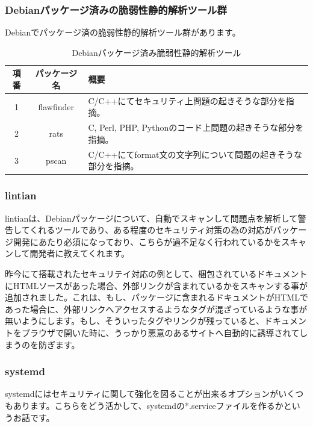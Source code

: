 \documentclass[mingoth,a4paper]{jsarticle}
\begin{document}
 \subsubsection{Debianパッケージ済みの脆弱性静的解析ツール群}

  Debianでパッケージ済の脆弱性静的解析ツール群があります。

\begin{table}
\begin{center}
\begin{tabular}{|c|c|p{5cm}|}
\hline
項番 & パッケージ名 & 概要 \\ \hline \hline
1 & flawfinder & C/C++にてセキュリティ上問題の起きそうな部分を指摘。 \\ \hline
2 & rats & C, Perl, PHP, Pythonのコード上問題の起きそうな部分を指摘。\\ \hline
3 & pscan & C/C++にてformat文の文字列について問題の起きそうな部分を指摘。 \\ \hline
\end{tabular}
\end{center}
\caption{Debianパッケージ済み脆弱性静的解析ツール}
\end{table}

\subsubsection{lintian}

 lintianは、Debianパッケージについて、自動でスキャンして問題点を解析して警告してくれるツールであり、ある程度のセキュリティ対策の為の対応がパッケージ開発にあたり必須になっており、こちらが過不足なく行われているかをスキャンして開発者に教えてくれます。

 昨今にて搭載されたセキュリテイ対応の例として、梱包されているドキュメントにHTMLソースがあった場合、外部リンクが含まれているかをスキャンする事が追加されました。これは、もし、パッケージに含まれるドキュメントがHTMLであった場合に、外部リンクへアクセスするようなタグが混ざっているような事が無いようにします。もし、そういったタグやリンクが残っていると、ドキュメントをブラウザで開いた時に、うっかり悪意のあるサイトへ自動的に誘導されてしまうのを防ぎます。

\subsubsection{systemd}

 systemdにはセキュリティに関して強化を図ることが出来るオプションがいくつもあります。こちらをどう活かして、systemdの*.serviceファイルを作るかというお話です。
 
\end{document}
